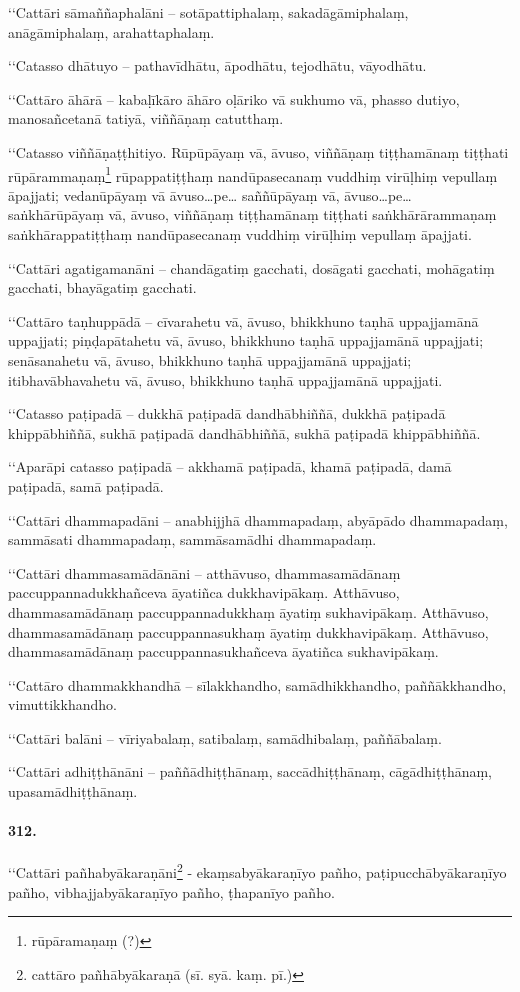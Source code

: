 ‘‘Cattāri sāmaññaphalāni – sotāpattiphalaṃ, sakadāgāmiphalaṃ, anāgāmiphalaṃ, arahattaphalaṃ.

‘‘Catasso dhātuyo – pathavīdhātu, āpodhātu, tejodhātu, vāyodhātu.

‘‘Cattāro āhārā – kabaḷīkāro āhāro oḷāriko vā sukhumo vā, phasso dutiyo, manosañcetanā tatiyā, viññāṇaṃ catutthaṃ.

‘‘Catasso viññāṇaṭṭhitiyo. Rūpūpāyaṃ vā, āvuso, viññāṇaṃ tiṭṭhamānaṃ tiṭṭhati rūpārammaṇaṃ\footnote{rūpāramaṇaṃ (?)} rūpappatiṭṭhaṃ nandūpasecanaṃ vuddhiṃ virūḷhiṃ vepullaṃ āpajjati; vedanūpāyaṃ vā āvuso…pe… saññūpāyaṃ vā, āvuso…pe… saṅkhārūpāyaṃ vā, āvuso, viññāṇaṃ tiṭṭhamānaṃ tiṭṭhati saṅkhārārammaṇaṃ saṅkhārappatiṭṭhaṃ nandūpasecanaṃ vuddhiṃ virūḷhiṃ vepullaṃ āpajjati.

‘‘Cattāri agatigamanāni – chandāgatiṃ gacchati, dosāgati gacchati, mohāgatiṃ gacchati, bhayāgatiṃ gacchati.

‘‘Cattāro taṇhuppādā – cīvarahetu vā, āvuso, bhikkhuno taṇhā uppajjamānā uppajjati; piṇḍapātahetu vā, āvuso, bhikkhuno taṇhā uppajjamānā uppajjati; senāsanahetu vā, āvuso, bhikkhuno taṇhā uppajjamānā uppajjati; itibhavābhavahetu vā, āvuso, bhikkhuno taṇhā uppajjamānā uppajjati.

‘‘Catasso paṭipadā – dukkhā paṭipadā dandhābhiññā, dukkhā paṭipadā khippābhiññā, sukhā paṭipadā dandhābhiññā, sukhā paṭipadā khippābhiññā.

‘‘Aparāpi catasso paṭipadā – akkhamā paṭipadā, khamā paṭipadā, damā paṭipadā, samā paṭipadā.

‘‘Cattāri dhammapadāni – anabhijjhā dhammapadaṃ, abyāpādo dhammapadaṃ, sammāsati dhammapadaṃ, sammāsamādhi dhammapadaṃ.

‘‘Cattāri dhammasamādānāni – atthāvuso, dhammasamādānaṃ paccuppannadukkhañceva āyatiñca dukkhavipākaṃ. Atthāvuso, dhammasamādānaṃ paccuppannadukkhaṃ āyatiṃ sukhavipākaṃ. Atthāvuso, dhammasamādānaṃ paccuppannasukhaṃ āyatiṃ dukkhavipākaṃ. Atthāvuso, dhammasamādānaṃ paccuppannasukhañceva āyatiñca sukhavipākaṃ.

‘‘Cattāro dhammakkhandhā – sīlakkhandho, samādhikkhandho, paññākkhandho, vimuttikkhandho.

‘‘Cattāri balāni – vīriyabalaṃ, satibalaṃ, samādhibalaṃ, paññābalaṃ.

‘‘Cattāri adhiṭṭhānāni – paññādhiṭṭhānaṃ, saccādhiṭṭhānaṃ, cāgādhiṭṭhānaṃ, upasamādhiṭṭhānaṃ.

\paragraph{312.} ‘‘Cattāri pañhabyākaraṇāni\footnote{cattāro pañhābyākaraṇā (sī. syā. kaṃ. pī.)} - ekaṃsabyākaraṇīyo pañho, paṭipucchābyākaraṇīyo pañho, vibhajjabyākaraṇīyo pañho, ṭhapanīyo pañho.

